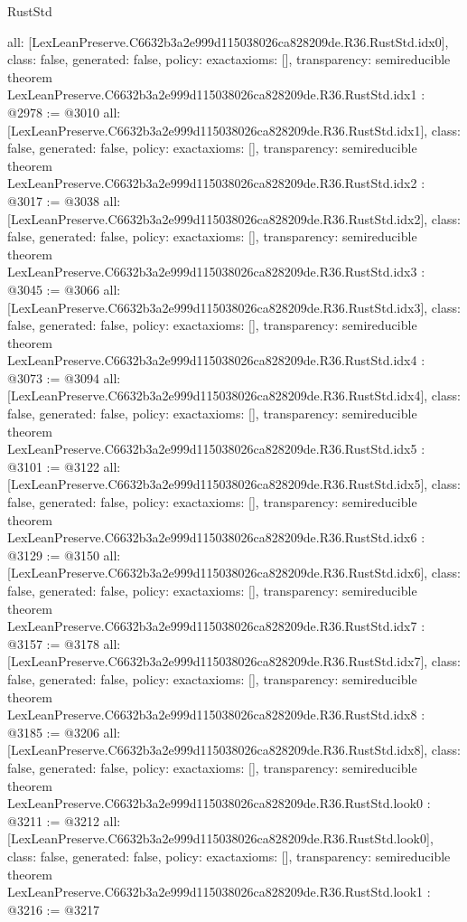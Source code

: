 \begin{lexlean}{RustStd}
\begin{coremodule}
{  all: [LexLeanPreserve.C6632b3a2e999d115038026ca828209de.R36.RustStd.idx0],
  class: false,
  generated: false,
  policy: exact{axioms: []},
  transparency: semireducible
}
theorem LexLeanPreserve.C6632b3a2e999d115038026ca828209de.R36.RustStd.idx1 : @2978 := @3010 {
  all: [LexLeanPreserve.C6632b3a2e999d115038026ca828209de.R36.RustStd.idx1],
  class: false,
  generated: false,
  policy: exact{axioms: []},
  transparency: semireducible
}
theorem LexLeanPreserve.C6632b3a2e999d115038026ca828209de.R36.RustStd.idx2 : @3017 := @3038 {
  all: [LexLeanPreserve.C6632b3a2e999d115038026ca828209de.R36.RustStd.idx2],
  class: false,
  generated: false,
  policy: exact{axioms: []},
  transparency: semireducible
}
theorem LexLeanPreserve.C6632b3a2e999d115038026ca828209de.R36.RustStd.idx3 : @3045 := @3066 {
  all: [LexLeanPreserve.C6632b3a2e999d115038026ca828209de.R36.RustStd.idx3],
  class: false,
  generated: false,
  policy: exact{axioms: []},
  transparency: semireducible
}
theorem LexLeanPreserve.C6632b3a2e999d115038026ca828209de.R36.RustStd.idx4 : @3073 := @3094 {
  all: [LexLeanPreserve.C6632b3a2e999d115038026ca828209de.R36.RustStd.idx4],
  class: false,
  generated: false,
  policy: exact{axioms: []},
  transparency: semireducible
}
theorem LexLeanPreserve.C6632b3a2e999d115038026ca828209de.R36.RustStd.idx5 : @3101 := @3122 {
  all: [LexLeanPreserve.C6632b3a2e999d115038026ca828209de.R36.RustStd.idx5],
  class: false,
  generated: false,
  policy: exact{axioms: []},
  transparency: semireducible
}
theorem LexLeanPreserve.C6632b3a2e999d115038026ca828209de.R36.RustStd.idx6 : @3129 := @3150 {
  all: [LexLeanPreserve.C6632b3a2e999d115038026ca828209de.R36.RustStd.idx6],
  class: false,
  generated: false,
  policy: exact{axioms: []},
  transparency: semireducible
}
theorem LexLeanPreserve.C6632b3a2e999d115038026ca828209de.R36.RustStd.idx7 : @3157 := @3178 {
  all: [LexLeanPreserve.C6632b3a2e999d115038026ca828209de.R36.RustStd.idx7],
  class: false,
  generated: false,
  policy: exact{axioms: []},
  transparency: semireducible
}
theorem LexLeanPreserve.C6632b3a2e999d115038026ca828209de.R36.RustStd.idx8 : @3185 := @3206 {
  all: [LexLeanPreserve.C6632b3a2e999d115038026ca828209de.R36.RustStd.idx8],
  class: false,
  generated: false,
  policy: exact{axioms: []},
  transparency: semireducible
}
theorem LexLeanPreserve.C6632b3a2e999d115038026ca828209de.R36.RustStd.look0 : @3211 := @3212 {
  all: [LexLeanPreserve.C6632b3a2e999d115038026ca828209de.R36.RustStd.look0],
  class: false,
  generated: false,
  policy: exact{axioms: []},
  transparency: semireducible
}
theorem LexLeanPreserve.C6632b3a2e999d115038026ca828209de.R36.RustStd.look1 : @3216 := @3217 {
}
\end{coremodule}
\end{lexlean}
